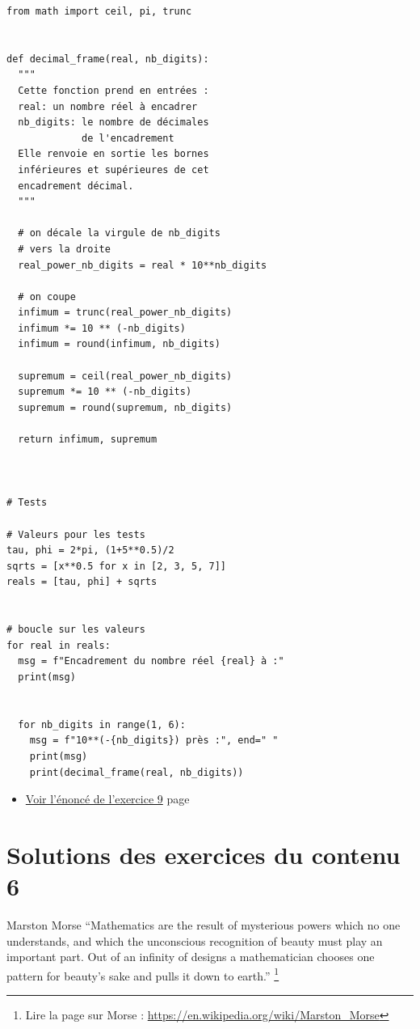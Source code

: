 \documentclass[a4paper,11pt]{book}
\begin{document}
\clearpage

\begin{verbatim}
from math import ceil, pi, trunc


def decimal_frame(real, nb_digits):
  """
  Cette fonction prend en entrées : 
  real: un nombre réel à encadrer
  nb_digits: le nombre de décimales
             de l'encadrement
  Elle renvoie en sortie les bornes
  inférieures et supérieures de cet
  encadrement décimal.
  """

  # on décale la virgule de nb_digits
  # vers la droite
  real_power_nb_digits = real * 10**nb_digits 

  # on coupe
  infimum = trunc(real_power_nb_digits)
  infimum *= 10 ** (-nb_digits)
  infimum = round(infimum, nb_digits)

  supremum = ceil(real_power_nb_digits)
  supremum *= 10 ** (-nb_digits)
  supremum = round(supremum, nb_digits)

  return infimum, supremum



# Tests

# Valeurs pour les tests
tau, phi = 2*pi, (1+5**0.5)/2
sqrts = [x**0.5 for x in [2, 3, 5, 7]]
reals = [tau, phi] + sqrts


# boucle sur les valeurs
for real in reals:
  msg = f"Encadrement du nombre réel {real} à :"
  print(msg)


  for nb_digits in range(1, 6):
    msg = f"10**(-{nb_digits}) près :", end=" "
    print(msg)
    print(decimal_frame(real, nb_digits))
\end{verbatim}

\begin{itemize}
\item \hyperref[org3125f8c]{Voir l'énoncé de l'exercice 9}
page~\pageref{page:sec2.5.2exo9}
\end{itemize}

\clearpage

\chapter{Solutions des exercices du contenu 6}
\label{sec:org373cd68}
\label{org4cedc13}
\label{page:sec8.6sols-cont6}

\begin{myquote}{Marston Morse}
\enquote{Mathematics are the result of mysterious powers which no one
understands, and which the unconscious recognition of beauty must
play an important part. Out of an infinity of designs a
mathematician chooses one pattern for beauty’s sake and pulls it
down to earth.}
\footnote{Lire la page sur Morse : \url{https://en.wikipedia.org/wiki/Marston_Morse}}
\end{myquote}
\end{document}
